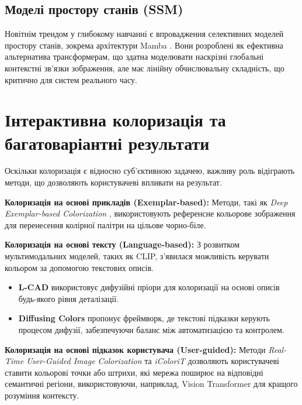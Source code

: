         \subsection{Моделі простору станів (SSM)}
            Новітнім трендом у глибокому навчанні є впровадження селективних моделей простору станів, зокрема архітектури Mamba \cite{2023-mamba}.
            Вони розроблені як ефективна альтернатива трансформерам, що здатна моделювати наскрізні глобальні контекстні зв'язки зображення,
            але має лінійну обчислювальну складність, що критично для систем реального часу.

    \section{Інтерактивна колоризація та багатоваріантні результати}

        Оскільки колоризація є відносно суб'єктивною задачею, важливу роль відіграють методи, що дозволяють користувачеві впливати на результат.

        \textbf{Колоризація на основі прикладів (Exemplar-based):}
        Методи, такі як \textit{Deep Exemplar-based Colorization} \cite{2018-deep-exemplar-based-colorization}, використовують референсне кольорове зображення для перенесення колірної палітри на цільове чорно-біле.

        \textbf{Колоризація на основі тексту (Language-based):}
        З розвитком мультимодальних моделей, таких як CLIP, з'явилася можливість керувати кольором за допомогою текстових описів.
        \begin{itemize}[label=$\bullet$]
            \item \textbf{L-CAD} \cite{2023-l-cad} використовує дифузійні пріори для колоризації на основі описів будь-якого рівня деталізації.
            \item \textbf{Diffusing Colors} \cite{2023-diffusing-colors} пропонує фреймворк, де текстові підказки керують процесом дифузії, забезпечуючи баланс між автоматизацією та контролем.
        \end{itemize}

        \textbf{Колоризація на основі підказок користувача (User-guided):}
        Методи \textit{Real-Time User-Guided Image Colorization} \cite{2017-real-time-user-guided-image-colorization} та \textit{iColoriT} \cite{2023-icolorit} дозволяють користувачеві ставити кольорові точки або штрихи, які мережа поширює на відповідні семантичні регіони, використовуючи, наприклад, Vision Transformer для кращого розуміння контексту.

